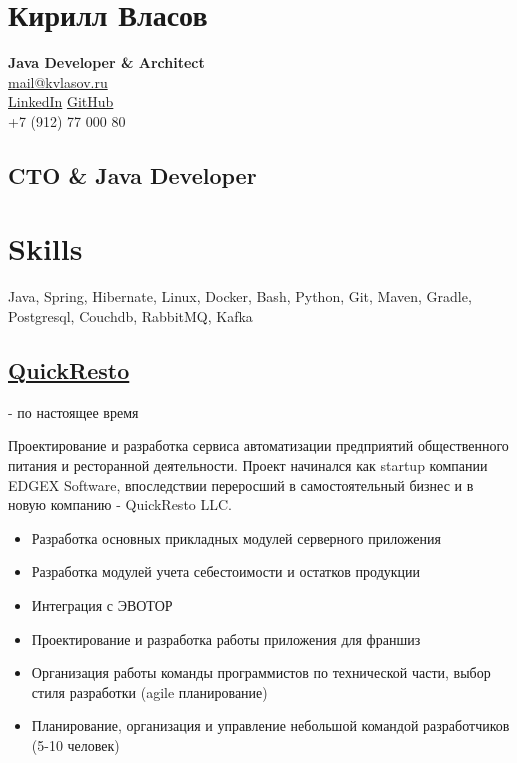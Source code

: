 \documentclass{article}
\begin{document}
\pagestyle{empty}
\setlength{\topskip}{0mm}
\setlength{\parindent}{0pt}
\setlength{\parskip}{4pt}
\raggedright
{}


\justifying
  
\section*{Кирилл Власов}

\textbf{Java Developer \& Architect}\\%
\href{mailto:mail@kvlasov.ru}{mail@kvlasov.ru}\\%
\href{https://ru.linkedin.com/in/kirill-vlasov-48451427}{LinkedIn}
\href{https://github.com/kirill-vlasov}{GitHub}\\%
+7 (912) 77 000 80	

\vspace{1em}

\subsection*{CTO \& Java Developer}


\section*{Skills}
Java, Spring, Hibernate,
Linux, Docker, Bash, Python,
Git, Maven, Gradle,
Postgresql, Couchdb,
RabbitMQ, Kafka


\subsection*{\href{https://www.quickresto.ru/}{QuickResto}}
 - по настоящее время
\normalsize

Проектирование и разработка сервиса автоматизации предприятий общественного питания и ресторанной деятельности. Проект начинался как startup компании EDGEX Software, впоследствии переросший в самостоятельный бизнес и в новую компанию - QuickResto LLC.

\begin{itemize}
  \item Разработка основных прикладных модулей серверного приложения
  \item Разработка модулей учета себестоимости и остатков продукции
  \item Интеграция с ЭВОТОР
  \item Проектирование и разработка работы приложения для франшиз
  \item Организация работы команды программистов по технической части, выбор стиля разработки (agile планирование)
  \item Планирование, организация и управление небольшой командой разработчиков (5-10 человек)
\end{itemize}
\end{document}
